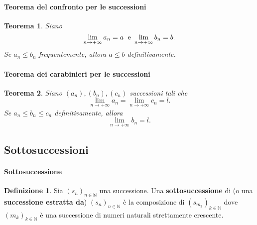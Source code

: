 \documentclass{article}
\theoremstyle{plain}
\newtheorem{thm}{Teorema}[section]
\theoremstyle{definition}
\newtheorem{defn}{Definizione}[section]
\theoremstyle{remark}
\begin{document}
\vspace{10pt}

\paragraph{Teorema del confronto per le successioni}
\begin{bxthm}
\begin{thm}
    Siano \[\lim_{n\to+\infty}a_n=a\;\textup{ e }\lim_{n\to+\infty}b_n=b.\]
    Se $a_n\leq b_n$ frequentemente, allora $a\leq b$ definitivamente.
\end{thm}
\end{bxthm}

\vspace{10pt}

\paragraph{Teorema dei carabinieri per le successioni}
\begin{bxthm}
\begin{thm}
    Siano $(a_n),(b_n),(c_n)$ successioni tali che 
    \[\lim_{n\to+\infty}a_n = \lim_{n\to+\infty}c_n = l.\]
    Se $a_n\leq b_n\leq c_n$ definitivamente, allora \[\lim_{n\to+\infty}b_n=l.\]
\end{thm}
\end{bxthm}

\vspace{10pt}

\subsection{Sottosuccessioni}

\vspace{10pt}

\paragraph{Sottosuccessione}
\begin{bxthm}
\begin{defn}
    Sia $(s_n)_{n\in \mathbb{N}}$ una successione.
    Una \textbf{sottosuccessione} di (o una \textbf{successione estratta da}) $(s_n)_{n\in \mathbb{N}}$ è la composizione di 
    $(s_{m_k})_{k\in \mathbb{N}}$ dove $(m_k)_{k\in \mathbb{N}}$ è una successione di numeri naturali strettamente crescente.
\end{defn}
\end{bxthm}
\end{document}
